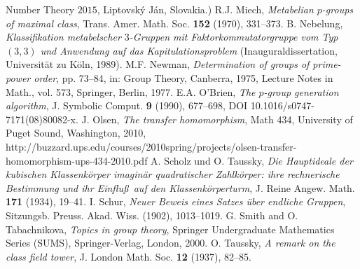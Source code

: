 \documentclass{amsart}
\theoremstyle{definition}
\numberwithin{equation}{section}
\begin{document}
\begin{thebibliography}{XX}
Number Theory \(2015\),
Liptovsk\'y J\'an, Slovakia.)
R.J. Miech,
\textit{Metabelian \(p\)-groups of maximal class},
Trans. Amer. Math. Soc.
\textbf{152}
(1970),
331--373.
B. Nebelung,
\textit{Klassifikation metabelscher \(3\)-Gruppen
mit Faktorkommutatorgruppe vom Typ \((3,3)\)
und Anwendung auf das Kapitulationsproblem}
(Inauguraldissertation,
Universit\"at zu K\"oln,
1989).
M.F. Newman,
\textit{Determination of groups of prime-power order},
pp. 73--84,
in: Group Theory, Canberra, 1975,
Lecture Notes in Math.,
vol. 573,
Springer,
Berlin,
1977.
E.A. O'Brien, 
\textit{The \(p\)-group generation algorithm}, 
J. Symbolic Comput.
\textbf{9}
(1990),
677--698,
DOI 10.1016/s0747-7171(08)80082-x.
J. Olsen,
\textit{The transfer homomorphism},
Math 434, University of Puget Sound, Washington, 2010,
http://buzzard.ups.edu/courses/2010spring/projects/olsen-transfer-homomorphism-ups-434-2010.pdf
A. Scholz und O. Taussky,
\textit{Die Hauptideale der kubischen Klassenk\"orper
imagin\"ar quadratischer Zahlk\"orper:
ihre rechnerische Bestimmung
und ihr Einflu\ss\ auf den Klassenk\"orperturm},
J. Reine Angew. Math.
\textbf{171}
(1934),
19--41.
I. Schur,
\textit{Neuer Beweis eines Satzes \"uber endliche Gruppen},
Sitzungsb. Preuss. Akad. Wiss.
(1902),
1013--1019.
G. Smith and O. Tabachnikova,
\textit{Topics in group theory},
Springer Undergraduate Mathematics Series (SUMS),
Springer-Verlag,
London,
2000.
O. Taussky,
\textit{A remark on the class field tower},
J. London Math. Soc.
\textbf{12}
(1937),
82--85.
\end{thebibliography}
\end{document}
